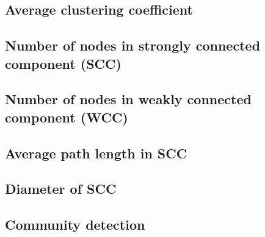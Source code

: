 \subsection{Average clustering coefficient}

\subsection{Number of nodes in strongly connected component (SCC)}

\subsection{Number of nodes in weakly connected component (WCC)}

\subsection{Average path length in SCC}

\subsection{Diameter of SCC}

\subsection{Community detection}